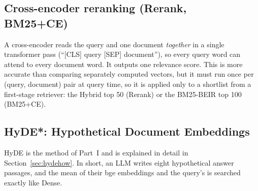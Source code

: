 \subsection{Cross-encoder reranking (Rerank, BM25+CE)~\cite{thakur2021beir,wang2020minilm}}
A cross-encoder reads the query and one document \emph{together} in a single transformer pass
(``[CLS] query [SEP] document''), so every query word can attend to every document word. It outputs
one relevance score. This is more accurate than comparing separately computed vectors, but it must
run once per (query, document) pair at query time, so it is applied only to a shortlist from a
first-stage retriever: the Hybrid top 50 (Rerank) or the BM25-BEIR top 100 (BM25+CE).
\begin{center}\end{center}

\subsection{HyDE*: Hypothetical Document Embeddings~\cite{gao2023hyde}}
HyDE is the method of Part~I and is explained in detail in Section~\ref{sec:hydehow}. In short, an LLM
writes eight hypothetical answer passages, and the mean of their bge embeddings and the query's is
searched exactly like Dense.

